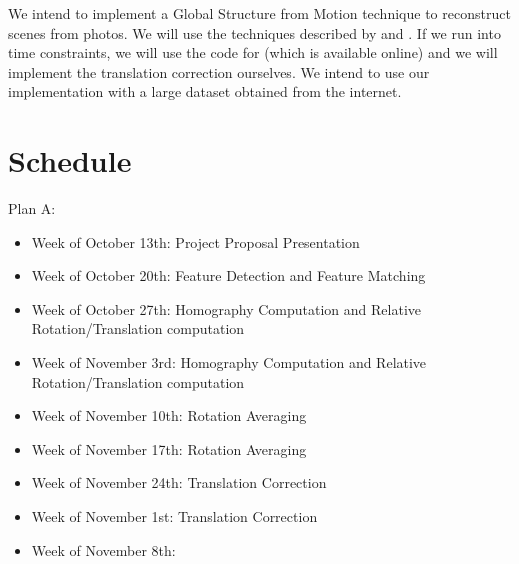\documentclass[conference, 12pt]{acmsiggraph}
\begin{document}
We intend to implement a Global Structure from Motion technique to reconstruct scenes from photos. We will use the techniques described by \cite{rotation} and \cite{translation}. If we run into time constraints, we will use the code for \cite{rotation} (which is available online) and we will implement the translation correction ourselves. We intend to use our implementation with a large dataset obtained from the internet.

\section{Schedule}

Plan A:

\begin{itemize}
	\item {Week of October 13th}: Project Proposal Presentation
	\item {Week of October 20th}: Feature Detection and Feature Matching
	\item {Week of October 27th}: Homography Computation and Relative Rotation/Translation computation
	\item {Week of November 3rd}: Homography Computation and Relative Rotation/Translation computation
	\item {Week of November 10th}: Rotation Averaging
	\item {Week of November 17th}: Rotation Averaging
	\item {Week of November 24th}: Translation Correction
	\item {Week of November 1st}: Translation Correction
	\item {Week of November 8th}:


\end{itemize}





\end{document}
